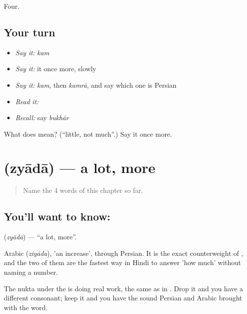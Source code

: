 \begin{grammarlens}[title={What you've built}]
Four.
\end{grammarlens}

\subsection*{Your turn}
\begin{itemize}
\raggedright
  \item \emph{Say it:} \emph{kam}
  \item \emph{Say it:} it once more, slowly
  \item \emph{Say it:} \emph{kam}, then \emph{kamrā}, and say which one is Persian
  \item \emph{Read it:} \textbf{}
  \item \emph{Recall:} say \emph{bukhār}
\end{itemize}

\begin{tcolorbox}[breakable,colback=teal!4,colframe=teal!35!black,title={Before you move on}]
What does  mean? (\textquotedblleft{}little, not much\textquotedblright{}.) Say it once more.
\end{tcolorbox}
\section[\texorpdfstring{\hi{ज़्यादा} (zyādā)}{ज़्यादा (zyādā)}]{ (zyādā) — a lot, more}

\label{lesson:HI-C64-more}



\begin{quote}
Name the 4 words of this chapter so far.
\end{quote}

\subsection*{You'll want to know: }
\textbf{} (\emph{zyādā}) — \textquotedblleft{}a lot, more\textquotedblright{}.

Arabic  (\emph{ziyāda}), 'an increase', through Persian. It is the exact counterweight of , and the two of them are the fastest way in Hindi to answer 'how much' without naming a number.

The nukta under the  is doing real work, the same as in . Drop it and you have a different consonant; keep it and you have the sound Persian and Arabic brought with the word.

